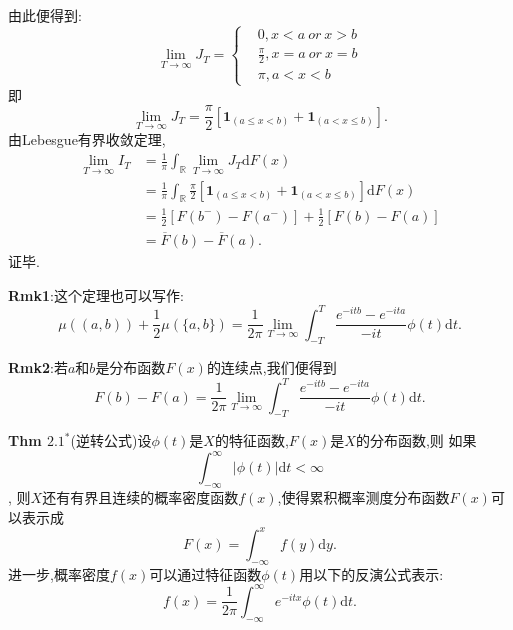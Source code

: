 \begin{frame}
	由此便得到:\begin{equation}
		\lim_{T\to\infty}J_T = 	\left\{
		\begin{aligned}
		&0, x<a\ or\ x>b \\
		&\frac{\pi}{2},x=a\ or\ x=b \\
		&\pi, a<x<b
		\end{aligned}
		\right.
	\end{equation}
	即\begin{equation}
		\lim_{T\to\infty}J_T = \frac{\pi}{2}[\bm{1}_{(a\leqslant x<b)}+\bm{1}_{(a<x\leqslant b)}].
	\end{equation}
	由Lebesgue有界收敛定理,\begin{equation}
	\begin{split}
		\lim_{T\to\infty}I_T &= \frac{1}{\pi}\int_{\mathbb{R}}\lim_{T\to\infty}J_T\mathrm{d}F(x) \\
		&= \frac{1}{\pi}\int_{\mathbb{R}}\frac{\pi}{2}[\bm{1}_{(a\leqslant x<b)}+\bm{1}_{(a<x\leqslant b)}]\mathrm{d}F(x) \\
		&= \frac{1}{2}[F(b^-)-F(a^-)]+\frac{1}{2}[F(b)-F(a)] \\
		&= \overline{F}(b)-\overline{F}(a).
	\end{split}		
	\end{equation}
	证毕.
\end{frame}

\begin{frame}
	\textbf{Rmk1}:这个定理也可以写作:
	\begin{equation}
	\mu((a,b)) + \frac{1}{2}\mu(\{a,b\}) = \frac{1}{2\pi}\lim_{T\to\infty}\int_{-T}^{T}\frac{e^{-itb}-e^{-ita}}{-it}\phi(t)\mathrm{d}t.
	\end{equation}
	
	\textbf{Rmk2}:若$a$和$b$是分布函数$F(x)$的连续点,我们便得到
	\begin{equation}
	F(b)-F(a) = \frac{1}{2\pi}\lim_{T\to\infty}\int_{-T}^{T}\frac{e^{-itb}-e^{-ita}}{-it}\phi(t)\mathrm{d}t.
	\end{equation}
\end{frame}

\begin{frame}
\begin{block}{\textbf{Thm $2.1^*$}(逆转公式)设$\phi(t)$是$X$的特征函数,$F(x)$是$X$的分布函数,则}
	如果\begin{equation}
	\int_{-\infty}^\infty |\phi(t)|\mathrm{d}t<\infty
	\end{equation},
	则$X$还有有界且连续的概率密度函数$f(x)$,使得累积概率测度分布函数$F(x)$可以表示成
	\begin{equation}
	F(x) = \int_{-\infty}^x f(y)\mathrm{d}y.
	\end{equation}
	进一步,概率密度$f(x)$可以通过特征函数$\phi(t)$用以下的反演公式表示:
	\begin{equation}
	f(x) = \frac{1}{2\pi}\int_{-\infty}^\infty e^{-itx}\phi(t)\mathrm{d}t.
	\end{equation}
\end{block}
\end{frame}

